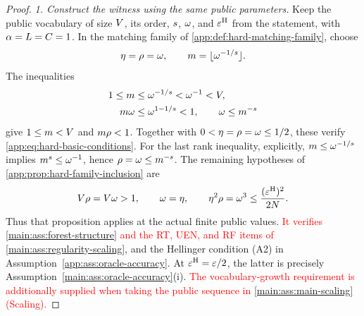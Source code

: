 \begin{proof}

\emph{1. Construct the witness using the same public parameters.}
Keep the public vocabulary of size \(V\), its order,
\(s\), \(\omega\), and \(\varepsilon^{\mathrm H}\) from the
statement, with
\(\alpha=L=C=1\).
In the matching family of \cref{app:def:hard-matching-family}, choose
\begin{equation}
 \eta=\rho=\omega,\qquad
 m=\lfloor\omega^{-1/s}\rfloor.
 \label{app:eq:benchmark-hard-witness}
\end{equation}
The inequalities
\[
 \begin{aligned}
 1\le m
 &\le\omega^{-1/s}<\omega^{-1}<V,\\
 m\omega
 &\le\omega^{1-1/s}<1,\qquad
 \omega\le m^{-s}
 \end{aligned}
\]
give \(1\le m<V\) and
\(m\rho<1\). Together with
\(0<\eta=\rho=\omega\le1/2\), these verify
\eqref{app:eq:hard-basic-conditions}.
For the last rank inequality, explicitly,
\(m\le\omega^{-1/s}\) implies
\(m^{s}\le\omega^{-1}\), hence
\(\rho=\omega\le m^{-s}\).
The remaining hypotheses of \cref{app:prop:hard-family-inclusion} are
\[
 V\rho=V\omega>1,
 \qquad
 \omega=\eta,
 \qquad
 \eta^2\rho
 =\omega^3\le\frac{(\varepsilon^{\mathrm H})^2}{2N}.
\]
Thus that proposition applies at the actual finite public values.
\textcolor{red}{It verifies \cref{main:ass:forest-structure} and the
RT, UEN, and RF items of \cref{main:ass:regularity-scaling}},
and the Hellinger condition (A2) in Assumption~\ref{app:ass:oracle-accuracy}.
At $\varepsilon^{\mathrm H}=\varepsilon/2$, the latter is precisely
Assumption~\ref{main:ass:oracle-accuracy}(i).
\textcolor{red}{The vocabulary-growth requirement is additionally supplied
when taking the public sequence in \cref{main:ass:main-scaling} (Scaling).}


\end{proof}
